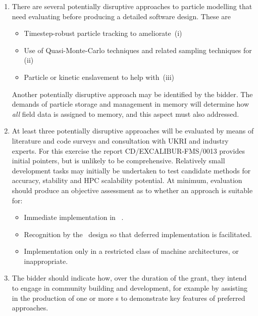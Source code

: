 \begin{enumerate}

\item There are several potentially disruptive approaches to particle
modelling that need
evaluating before producing a detailed software design. These are 
\begin{itemize}
\item Timestep-robust particle tracking to ameliorate~(i)
\item Use of Quasi-Monte-Carlo techniques and related sampling techniques for (ii)
\item Particle or kinetic enslavement to help with~(iii)
\end{itemize}
Another potentially disruptive approach may be identified by the bidder.
The demands of particle storage and management in memory will determine how \emph{all} field data
is assigned to memory, and this aspect must also addressed.


\item At least three potentially disruptive approaches will be evaluated by means of 
literature and code surveys and consultation
with UKRI and industry experts. For this exercise the report
CD/EXCALIBUR-FMS/0013 provides initial pointers, but is unlikely
to be comprehensive.
Relatively small development tasks may initially be undertaken to 
test candidate methods for
accuracy, stability and HPC scalability potential.
At minimum, evaluation should produce an objective assessment as to
whether an approach is suitable for:
\begin{itemize}
\item Immediate implementation in \nep\ .
\item Recognition by the \nep\ design so that deferred implementation is facilitated.
\item Implementation only in a restricted class of machine architectures,
or inappropriate.
\end{itemize}

\item The bidder should indicate how, over the duration of the grant, they intend to engage
in community building and development, for example by assisting in the production
of one or more \papp s to demonstrate key features of preferred approaches.


\end{enumerate}

%

